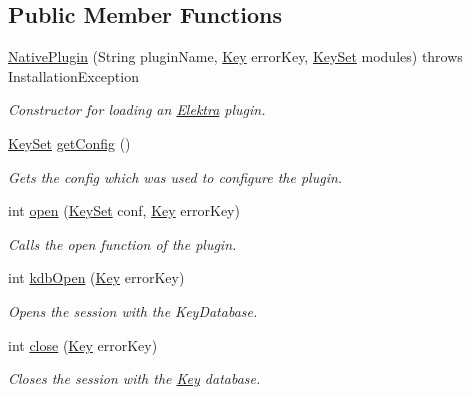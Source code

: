 \subsection*{Public Member Functions}
\begin{DoxyCompactItemize}
\item 
\hyperlink{classorg_1_1libelektra_1_1plugin_1_1NativePlugin_ad228084d20bd57c561e49ee755e9c751}{Native\+Plugin} (String plugin\+Name, \hyperlink{classorg_1_1libelektra_1_1Key}{Key} error\+Key, \hyperlink{classorg_1_1libelektra_1_1KeySet}{Key\+Set} modules)  throws Installation\+Exception 	
\begin{DoxyCompactList}\small\item\em Constructor for loading an \hyperlink{interfaceorg_1_1libelektra_1_1Elektra}{Elektra} plugin. \end{DoxyCompactList}\item 
\hyperlink{classorg_1_1libelektra_1_1KeySet}{Key\+Set} \hyperlink{classorg_1_1libelektra_1_1plugin_1_1NativePlugin_af9c78565029ed2ae38241759549e4b5a}{get\+Config} ()
\begin{DoxyCompactList}\small\item\em Gets the config which was used to configure the plugin. \end{DoxyCompactList}\item 
int \hyperlink{classorg_1_1libelektra_1_1plugin_1_1NativePlugin_a81510de92e0d65784e877bf53b89756a}{open} (\hyperlink{classorg_1_1libelektra_1_1KeySet}{Key\+Set} conf, \hyperlink{classorg_1_1libelektra_1_1Key}{Key} error\+Key)
\begin{DoxyCompactList}\small\item\em Calls the open function of the plugin. \end{DoxyCompactList}\item 
int \hyperlink{classorg_1_1libelektra_1_1plugin_1_1NativePlugin_a232c37208b79734c6be8a9f426efa56a}{kdb\+Open} (\hyperlink{classorg_1_1libelektra_1_1Key}{Key} error\+Key)
\begin{DoxyCompactList}\small\item\em Opens the session with the Key\+Database. \end{DoxyCompactList}\item 
int \hyperlink{classorg_1_1libelektra_1_1plugin_1_1NativePlugin_acd6f4e0e81a11a1eba64dfa164c67a1f}{close} (\hyperlink{classorg_1_1libelektra_1_1Key}{Key} error\+Key)
\begin{DoxyCompactList}\small\item\em Closes the session with the \hyperlink{classorg_1_1libelektra_1_1Key}{Key} database. \end{DoxyCompactList}\item 

\end{DoxyCompactItemize}
